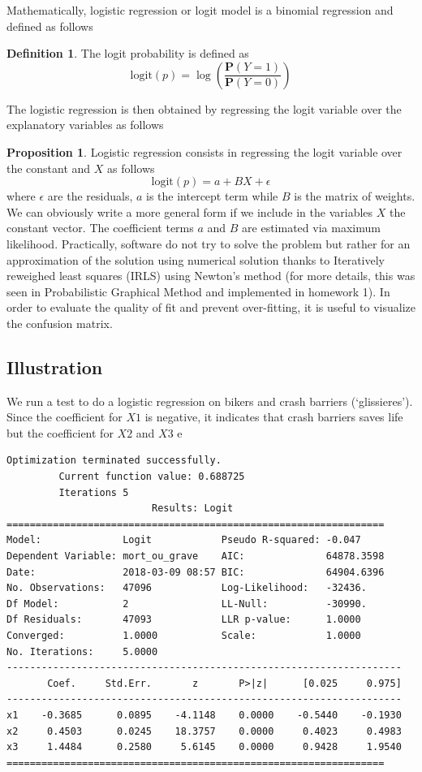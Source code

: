 \documentclass[a4paper]{article}
\theoremstyle{definition}
\theoremstyle{proposition}
\newtheorem{definition}{Definition}[section]
\newtheorem{proposition}{Proposition}[section]
\begin{document}
Mathematically, logistic regression or logit model is a binomial regression and defined as follows
\begin{definition}
The logit probability is defined as
\[
\text{logit}(p)= \log\left( \frac{ \mathbf{P}(Y=1)} { \mathbf{P}(Y=0)} \right)
\] 
\end{definition}

The logistic regression is then obtained by regressing the logit variable over the explanatory variables as follows
\begin{proposition}
Logistic regression consists in regressing the logit variable over the constant and $X$ as follows
\[
\text{logit}(p)= a + B X + \epsilon
\]
where $\epsilon$ are the residuals, $a$ is the intercept term while $B$ is the matrix of weights. We can obviously write a more general form if we include in the variables $X$ the constant vector.
The coefficient terms $a$ and $B$ are estimated via maximum likelihood. Practically, software do not try to solve the problem but rather for an approximation of the solution using numerical solution thanks to Iteratively reweighed least squares (IRLS) using Newton's method (for more details, this was seen in Probabilistic Graphical Method and implemented in homework 1). In order to evaluate the quality of fit and prevent over-fitting, it is useful to visualize the confusion matrix.
\end{proposition}


\subsection{Illustration}
We run a test to do a logistic regression on bikers and crash barriers (`glissieres'). Since the coefficient for $X1$ is negative, it indicates that crash barriers saves life but the coefficient for $X2$ and $X3$ e
\begin{verbatim}
Optimization terminated successfully.
         Current function value: 0.688725
         Iterations 5
                         Results: Logit
=================================================================
Model:              Logit            Pseudo R-squared: -0.047    
Dependent Variable: mort_ou_grave    AIC:              64878.3598
Date:               2018-03-09 08:57 BIC:              64904.6396
No. Observations:   47096            Log-Likelihood:   -32436.   
Df Model:           2                LL-Null:          -30990.   
Df Residuals:       47093            LLR p-value:      1.0000    
Converged:          1.0000           Scale:            1.0000    
No. Iterations:     5.0000                                       
--------------------------------------------------------------------
       Coef.     Std.Err.       z       P>|z|      [0.025     0.975]
--------------------------------------------------------------------
x1    -0.3685      0.0895    -4.1148    0.0000    -0.5440    -0.1930
x2     0.4503      0.0245    18.3757    0.0000     0.4023     0.4983
x3     1.4484      0.2580     5.6145    0.0000     0.9428     1.9540
=================================================================

\end{verbatim}
\end{document}
